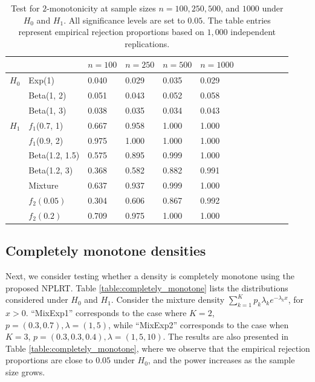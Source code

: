 \documentclass[12pt,letterpaper, twoside, openany]{article}
\theoremstyle{plain}
\begin{document}
\begin{table}
\centering
\begin{tabular}{lllllll|lllll}
  \hline
& & $n=100$ & $n=250$ & $n=500$ & $n=1000$\\ \hline
$H_0$ &Exp(1) & 0.040 & 0.029 & 0.035 & 0.029 \\ 
  &Beta(1, 2)& 0.051 & 0.043 & 0.052 & 0.058 \\ 
  & Beta(1, 3) & 0.038 & 0.035 & 0.034 & 0.043 \\ 
  \hline
$H_1$ &  $f_1$(0.7, 1) & 0.667 & 0.958 & 1.000 & 1.000 \\ 
  & $f_1$(0.9, 2) &  0.975 & 1.000 & 1.000 & 1.000 \\
  & Beta(1.2, 1.5) & 0.575 & 0.895 & 0.999 & 1.000 \\ 
  & Beta(1.2, 3) &0.368 & 0.582 & 0.882 & 0.991 \\  
  &Mixture & 0.637 & 0.937 & 0.999 & 1.000 \\ 
  & $f_2(0.05)$ & 0.304 & 0.606 & 0.867 & 0.992 \\   
    & $f_2(0.2)$ & 0.709 & 0.975 & 1.000 & 1.000 \\  
   \hline
\end{tabular}
\caption{Test for $2$-monotonicity at sample sizes $n=100, 250, 500$, and $1000$ under $H_0$ and $H_1$. All significance levels are set to $0.05$. The table entries represent empirical rejection proportions based on $1{,}000$ independent replications.}
    \label{table:k_monotone}
\end{table}

\subsection{Completely monotone densities}
Next, we consider testing whether a density is completely monotone using the proposed NPLRT. Table  \ref{table:completely_monotone} lists the distributions considered under $H_0$ and $H_1$. Consider the mixture density $\sum^K_{k=1} p_k \lambda_k e^{-\lambda_k x}$, for $x > 0$. ``MixExp1'' corresponds to the case where $K=2$, $p = (0.3, 0.7), \lambda = (1, 5)$, while ``MixExp2'' corresponds to the case when $K=3$, $p = (0.3, 0.3, 0.4), \lambda = (1, 5, 10)$. The results are also presented in Table \ref{table:completely_monotone}, where we observe that the empirical rejection proportions are close to $0.05$ under $H_0$, and the power increases as the sample size grows. 
\end{document}

